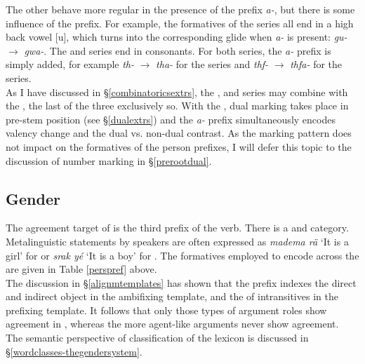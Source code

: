 The other  behave more regular in the presence of the  prefix \emph{a-}, but there is some influence of the  prefix. For example, the formatives of the \Betatwo{} series all end in a high back vowel [u], which turns into the corresponding glide when \emph{a-} is present: \Ssg{} \emph{gu-} $\rightarrow$ \emph{gwa-}. The \Bet{} and \Betatwo{} series end in consonants. For both series, the \emph{a-} prefix is simply added, for example \Stnsg{} \emph{th-} $\rightarrow$ \emph{tha-} for the \Bet{} series and \Stnsg{} \emph{thf-} $\rightarrow$ \emph{thfa-} for the \Betatwo{} series.\\

As I have discussed in \S{}\ref{combinatoricsextrs}, the \Bet{}, \Betaone{} and \Gam{} series may combine with the , the last of the three exclusively so. With the , dual marking takes place in pre-stem position (see \S{}\ref{dualextrs}) and the \emph{a-} prefix simultaneously encodes valency change and the dual vs. non-dual contrast. As the marking pattern does not impact on the formatives of the person prefixes, I will defer this topic to the discussion of number marking in \S{}\ref{prerootdual}.

\subsection{Gender} \label{gendersubsec}

The agreement target of  is the third  prefix of the verb. There is a  and   category. Metalinguistic statements by speakers are often expressed as \emph{madema rä} `It is a girl' for  or \emph{srak yé} `It is a boy' for . The formatives employed to encode  across the  are given in Table \ref{perspref} above.\\

The discussion in \S{}\ref{alignmtemplates} has shown that the prefix indexes the direct and indirect object in the ambifixing  template, and the  of intransitives in the prefixing template. It follows that only those types of argument roles show agreement in , whereas the more agent-like arguments never show  agreement.\\

The semantic perspective of  classification of the  lexicon is discussed in \S{}\ref{wordclasses-thegendersystem}.

